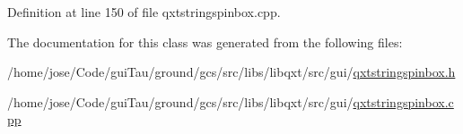 Definition at line 150 of file qxtstringspinbox.\-cpp.



The documentation for this class was generated from the following files\-:\begin{DoxyCompactItemize}
\item 
/home/jose/\-Code/gui\-Tau/ground/gcs/src/libs/libqxt/src/gui/\hyperlink{qxtstringspinbox_8h}{qxtstringspinbox.\-h}\item 
/home/jose/\-Code/gui\-Tau/ground/gcs/src/libs/libqxt/src/gui/\hyperlink{qxtstringspinbox_8cpp}{qxtstringspinbox.\-cpp}\end{DoxyCompactItemize}
